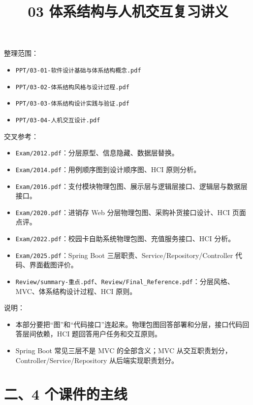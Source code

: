 \documentclass[UTF8,zihao=-4]{ctexart}
\title{03 体系结构与人机交互复习讲义}
\author{}
\date{}
\begin{document}
\maketitle
\tableofcontents
\newpage


整理范围：

\begin{itemize}
\item \texttt{PPT/03-01-软件设计基础与体系结构概念.pdf}
\item \texttt{PPT/03-02-体系结构风格与设计过程.pdf}
\item \texttt{PPT/03-03-体系结构设计实践与验证.pdf}
\item \texttt{PPT/03-04-人机交互设计.pdf}
\end{itemize}

交叉参考：

\begin{itemize}
\item \texttt{Exam/2012.pdf}：分层原型、信息隐藏、数据层替换。
\item \texttt{Exam/2014.pdf}：用例顺序图到设计顺序图、HCI 原则分析。
\item \texttt{Exam/2016.pdf}：支付模块物理包图、展示层与逻辑层接口、逻辑层与数据层接口。
\item \texttt{Exam/2020.pdf}：进销存 Web 分层物理包图、采购补货接口设计、HCI 页面点评。
\item \texttt{Exam/2022.pdf}：校园卡自助系统物理包图、充值服务接口、HCI 分析。
\item \texttt{Exam/2025.pdf}：Spring Boot 三层职责、Service/Repository/Controller 代码、界面截图评价。
\item \texttt{Review/summary-重点.pdf}、\texttt{Review/Final\_Reference.pdf}：分层风格、MVC、体系结构设计过程、HCI 原则。
\end{itemize}

说明：

\begin{itemize}
\item 本部分要把“图”和“代码接口”连起来。物理包图回答部署和分层，接口代码回答层间依赖，HCI 题回答用户任务和交互原则。
\item Spring Boot 常见三层不是 MVC 的全部含义；MVC 从交互职责划分，Controller/Service/Repository 从后端实现职责划分。
\end{itemize}

\section{二、4 个课件的主线}
\end{document}
